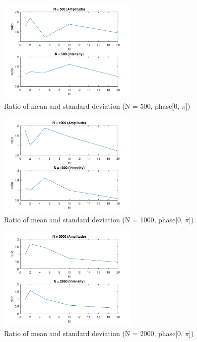 \documentclass{article}
\begin{document}
\begin{figure}[H]
	\centering
	\includegraphics[width = 0.6\textwidth]{src/pi/ratio_500.pdf}
	\caption{Ratio of mean and standard deviation (N = 500, phase[0, $\pi$])}
	\label{fig:ratio-500-pi}
\end{figure}
\begin{figure}[H]
	\centering
	\includegraphics[width = 0.6\textwidth]{src/pi/ratio_1000.pdf}
	\caption{Ratio of mean and standard deviation (N = 1000, phase[0, $\pi$])}
	\label{fig:ratio-1000-pi}
\end{figure}
\begin{figure}[H]
	\centering
	\includegraphics[width = 0.6\textwidth]{src/pi/ratio_2000.pdf}
	\caption{Ratio of mean and standard deviation (N = 2000, phase[0, $\pi$])}
	\label{fig:ratio-2000-pi}
\end{figure}
\end{document}
